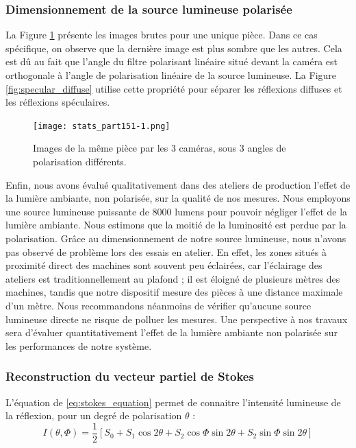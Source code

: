 \subsubsection{Dimensionnement de la source lumineuse polarisée}
La Figure \ref{fig:raw_measures} présente les images brutes pour une unique pièce.
Dans ce cas spécifique, on observe que la dernière image est plus sombre que les autres.
Cela est dû au fait que l'angle du filtre polarisant linéaire situé devant la caméra est orthogonale à l'angle de polarisation linéaire de la source lumineuse.
La Figure \ref{fig:specular_diffuse} utilise cette propriété pour séparer les réflexions diffuses et les réflexions spéculaires.

\begin{figure}[htbp]
	\centering
	\texttt{[image: stats\_part151-1.png]}
	\caption{Images de la même pièce par les 3 caméras, sous 3 angles de polarisation différents.}
	\label{fig:raw_measures}
\end{figure}

Enfin, nous avons évalué qualitativement dans des ateliers de production l'effet de la lumière ambiante, non polarisée, sur la qualité de nos mesures.
Nous employons une source lumineuse puissante de 8000 lumens pour pouvoir négliger l'effet de la lumière ambiante.
Nous estimons que la moitié de la luminosité est perdue par la polarisation.
Grâce au dimensionnement de notre source lumineuse, nous n'avons pas observé de problème lors des essais en atelier.
En effet, les zones situés à proximité direct des machines sont souvent peu éclairées, car l'éclairage des ateliers est traditionnellement au plafond ; il est éloigné de plusieurs mètres des machines, tandis que notre dispositif mesure des pièces à une distance maximale d'un mètre.
Nous recommandons néanmoins de vérifier qu'aucune source lumineuse directe ne risque de polluer les mesures.
Une perspective à nos travaux sera d'évaluer quantitativement l'effet de la lumière ambiante non polarisée sur les performances de notre système.

\subsubsection{Reconstruction du vecteur partiel de Stokes}
L'équation de \citeauthor{stokes_composition_1851} \ref{eq:stokes_equation} permet de connaitre l'intensité lumineuse de la réflexion, pour un degré de polarisation $\theta$ \cite{stokes_composition_1851} :
\begin{equation} \label{eq:stokes_equation}
	I(\theta,\Phi) = \frac{1}{2}[S_0+S_1\cos 2\theta+S_2\cos \Phi \sin 2\theta+S_2\sin \Phi \sin 2\theta]
\end{equation}

